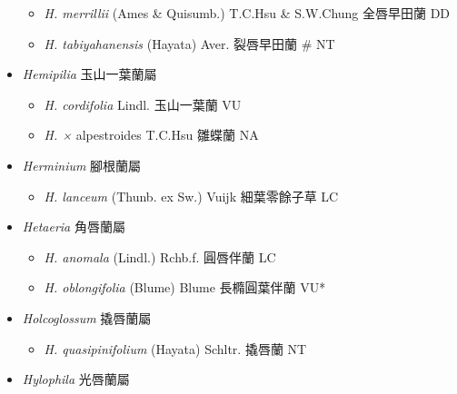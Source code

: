 \begin{itemize}
  \begin{itemize}
        \item[] \textit{H. merrillii} (Ames \& Quisumb.) T.C.Hsu \& S.W.Chung  全唇早田蘭   DD
        \item[] \textit{H. tabiyahanensis} (Hayata) Aver.  裂唇早田蘭  \# NT
  \end{itemize}
 \item[] \textit{Hemipilia} 玉山一葉蘭屬
                                
  \begin{itemize}
        \item[] \textit{H. cordifolia} Lindl.  玉山一葉蘭   VU
        \item[] \textit{H. ×} alpestroides \textit{} T.C.Hsu  雛蝶蘭   NA
  \end{itemize}
 \item[] \textit{Herminium} 腳根蘭屬
                                
  \begin{itemize}
        \item[] \textit{H. lanceum} (Thunb. ex Sw.) Vuijk  細葉零餘子草   LC
  \end{itemize}
 \item[] \textit{Hetaeria} 角唇蘭屬
                                
  \begin{itemize}
        \item[] \textit{H. anomala} (Lindl.) Rchb.f.  圓唇伴蘭   LC
        \item[] \textit{H. oblongifolia} (Blume) Blume  長橢圓葉伴蘭   VU*
  \end{itemize}
 \item[] \textit{Holcoglossum} 撬唇蘭屬
                                
  \begin{itemize}
        \item[] \textit{H. quasipinifolium} (Hayata) Schltr.  撬唇蘭   NT
  \end{itemize}
 \item[] \textit{Hylophila} 光唇蘭屬
                                

\end{itemize}

